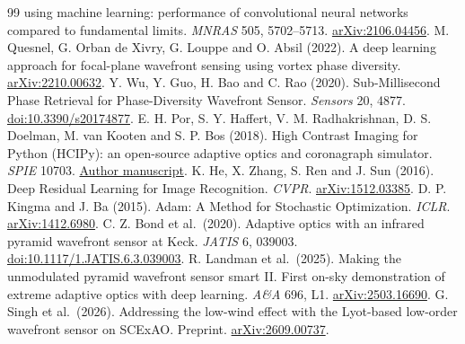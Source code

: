 \documentclass[11pt,a4paper]{article}
\begin{document}
\begin{thebibliography}{99}
using machine learning: performance of convolutional neural networks compared
to fundamental limits. \emph{MNRAS} 505, 5702--5713.
\href{https://arxiv.org/abs/2106.04456}{arXiv:2106.04456}.
 M. Quesnel, G. Orban de Xivry, G. Louppe and O. Absil (2022).
A deep learning approach for focal-plane wavefront sensing using vortex phase
diversity. \href{https://arxiv.org/abs/2210.00632}{arXiv:2210.00632}.
 Y. Wu, Y. Guo, H. Bao and C. Rao (2020). Sub-Millisecond Phase
Retrieval for Phase-Diversity Wavefront Sensor. \emph{Sensors} 20, 4877.
\href{https://doi.org/10.3390/s20174877}{doi:10.3390/s20174877}.
 E. H. Por, S. Y. Haffert, V. M. Radhakrishnan, D. S. Doelman,
M. van Kooten and S. P. Bos (2018). High Contrast Imaging for Python (HCIPy):
an open-source adaptive optics and coronagraph simulator. \emph{SPIE} 10703.
\href{https://ehpor.github.io/assets/pdf/Por-2018-HCIPy.pdf}{Author manuscript}.
 K. He, X. Zhang, S. Ren and J. Sun (2016). Deep Residual Learning for
Image Recognition. \emph{CVPR}.
\href{https://arxiv.org/abs/1512.03385}{arXiv:1512.03385}.
 D. P. Kingma and J. Ba (2015). Adam: A Method for Stochastic
Optimization. \emph{ICLR}.
\href{https://arxiv.org/abs/1412.6980}{arXiv:1412.6980}.
 C. Z. Bond et al.\ (2020). Adaptive optics with an infrared
pyramid wavefront sensor at Keck. \emph{JATIS} 6, 039003.
\href{https://doi.org/10.1117/1.JATIS.6.3.039003}{doi:10.1117/1.JATIS.6.3.039003}.
 R. Landman et al.\ (2025). Making the unmodulated pyramid
wavefront sensor smart II. First on-sky demonstration of extreme adaptive
optics with deep learning. \emph{A\&A} 696, L1.
\href{https://arxiv.org/html/2503.16690v1}{arXiv:2503.16690}.
 G. Singh et al.\ (2026). Addressing the low-wind effect with the
Lyot-based low-order wavefront sensor on SCExAO. Preprint.
\href{https://arxiv.org/html/2609.00737v1}{arXiv:2609.00737}.
\end{thebibliography}
\end{document}
